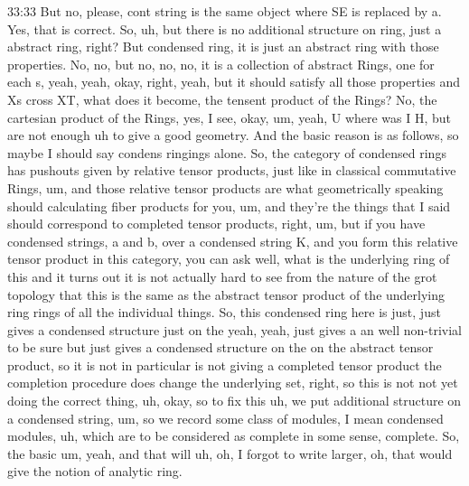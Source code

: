 \begin{unfinished}{33:33}
But no, please, cont string is the same object where SE is replaced by a. Yes, that is correct. So, uh, but there is no additional structure on ring, just a abstract ring, right? But condensed ring, it is just an abstract ring with those properties. No, no, but no, no, no, it is a collection of abstract Rings, one for each s, yeah, yeah, okay, right, yeah, but it should satisfy all those properties and Xs cross XT, what does it become, the tensent product of the Rings? No, the cartesian product of the Rings, yes, I see, okay, um, yeah, U where was I H, but are not enough uh to give a good geometry. And the basic reason is as follows, so maybe I should say condens ringings alone. So, the category of condensed rings has pushouts given by relative tensor products, just like in classical commutative Rings, um, and those relative tensor products are what geometrically speaking should calculating fiber products for you, um, and they're the things that I said should correspond to completed tensor products, right, um, but if you have condensed strings, a and b, over a condensed string K, and you form this relative tensor product in this category, you can ask well, what is the underlying ring of this and it turns out it is not actually hard to see from the nature of the grot topology that this is the same as the abstract tensor product of the underlying ring rings of all the individual things. So, this condensed ring here is just, just gives a condensed structure just on the yeah, yeah, just gives a an well non-trivial to be sure but just gives a condensed structure on the on the abstract tensor product, so it is not in particular is not giving a completed tensor product the completion procedure does change the underlying set, right, so this is not not yet doing the correct thing, uh, okay, so to fix this uh, we put additional structure on a condensed string, um, so we record some class of modules, I mean condensed modules, uh, which are to be considered as complete in some sense, complete. So, the basic um, yeah, and that will uh, oh, I forgot to write larger, oh, that would give the notion of analytic ring.


\end{unfinished}
